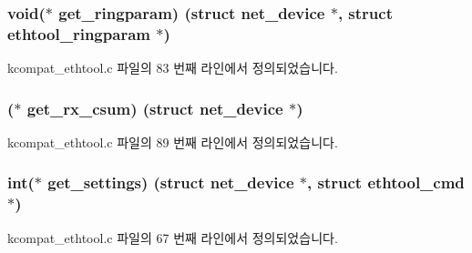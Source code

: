 \subsubsection[{\texorpdfstring{get\+\_\+ringparam}{get_ringparam}}]{\setlength{\rightskip}{0pt plus 5cm}void($\ast$ get\+\_\+ringparam) (struct net\+\_\+device $\ast$, struct {\bf ethtool\+\_\+ringparam} $\ast$)}\hypertarget{struct__kc__ethtool__ops_a44ff1c58a0ad4142bc1a7526f69f1daa}{}\label{struct__kc__ethtool__ops_a44ff1c58a0ad4142bc1a7526f69f1daa}


kcompat\+\_\+ethtool.\+c 파일의 83 번째 라인에서 정의되었습니다.

\subsubsection[{\texorpdfstring{get\+\_\+rx\+\_\+csum}{get_rx_csum}}]{($\ast$ get\+\_\+rx\+\_\+csum) (struct net\+\_\+device $\ast$)}\hypertarget{struct__kc__ethtool__ops_ad38c4d23836bd0d1916789d25ccddfef}{}\label{struct__kc__ethtool__ops_ad38c4d23836bd0d1916789d25ccddfef}


kcompat\+\_\+ethtool.\+c 파일의 89 번째 라인에서 정의되었습니다.

\subsubsection[{\texorpdfstring{get\+\_\+settings}{get_settings}}]{\setlength{\rightskip}{0pt plus 5cm}int($\ast$ get\+\_\+settings) (struct net\+\_\+device $\ast$, struct ethtool\+\_\+cmd $\ast$)}\hypertarget{struct__kc__ethtool__ops_ac27195cb98714f8dd9926e72c8c5763d}{}\label{struct__kc__ethtool__ops_ac27195cb98714f8dd9926e72c8c5763d}


kcompat\+\_\+ethtool.\+c 파일의 67 번째 라인에서 정의되었습니다.

